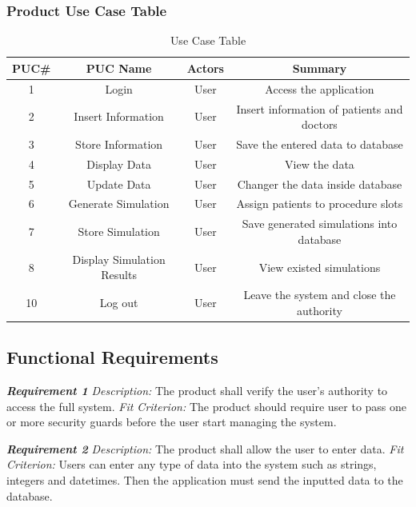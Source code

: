 \documentclass[12pt, titlepage]{article}
\begin{document}
\subsubsection{Product Use Case Table}
\begin{center}
\begin{table}[H]
  \centering
\begin{tabular}{ |c|c|c|c| }
\hline
PUC\# & PUC Name & Actors & Summary \\
\hline
1 & Login & User & Access the application \\
2 & Insert Information & User & Insert information of patients and doctors \\
3 & Store Information & User & Save the entered data to database \\
4 & Display Data & User & View the data \\
5 & Update Data & User & Changer the data inside database \\
6 & Generate Simulation & User & Assign patients to procedure slots \\
7 & Store Simulation & User & Save generated simulations into database \\
8 & Display Simulation Results & User & View existed simulations \\
10 & Log out & User & Leave the system and close the authority  \\
\hline
\end{tabular}
\caption{Use Case Table}
\end{table}
\end{center}

\subsection{Functional Requirements}
\textbf{\textit{Requirement 1}}\newline
\textit{Description:}\newline
The product shall verify the user’s authority to access the full system.\newline\newline
\textit{Fit Criterion:}\newline 
The product should require user to pass one or more security guards before the user start managing the system. 
\newline

\noindent\textbf{\textit{Requirement 2}}\newline
\textit{Description:}\newline
The product shall allow the user to enter data.\newline\newline
\textit{Fit Criterion:}\newline 
Users can enter any type of data into the system such as strings, integers and datetimes. Then the application must send the inputted data to the database.
\newline
\end{document}
